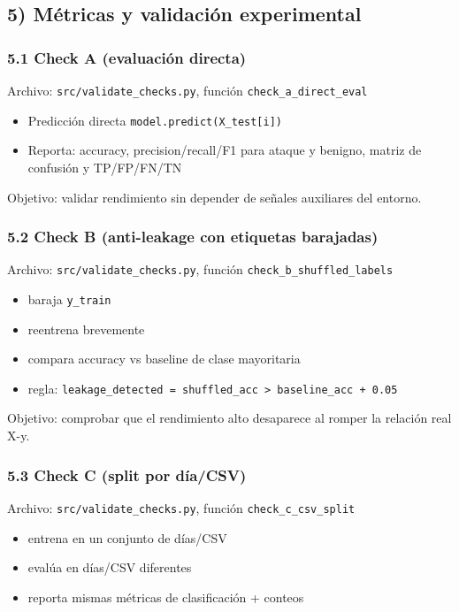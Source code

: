 ﻿\documentclass[12pt,a4paper]{article}
\begin{document}
\subsection{5) Métricas y validación experimental}

\subsubsection{5.1 Check A (evaluación directa)}

Archivo: \verb|src/validate_checks.py|, función \verb|check_a_direct_eval|

\begin{itemize}
  \item Predicción directa \verb|model.predict(X_test[i])|
  \item Reporta: accuracy, precision/recall/F1 para ataque y benigno, matriz de confusión y
        TP/FP/FN/TN
\end{itemize}

Objetivo: validar rendimiento sin depender de señales auxiliares del entorno.

\subsubsection{5.2 Check B (anti-leakage con etiquetas barajadas)}

Archivo: \verb|src/validate_checks.py|, función \verb|check_b_shuffled_labels|

\begin{itemize}
  \item baraja \texttt{y\_train}
  \item reentrena brevemente
  \item compara accuracy vs baseline de clase mayoritaria
  \item regla: \texttt{leakage\_detected = shuffled\_acc > baseline\_acc + 0.05}
\end{itemize}

Objetivo: comprobar que el rendimiento alto desaparece al romper la relación real X-y.

\subsubsection{5.3 Check C (split por día/CSV)}

Archivo: \verb|src/validate_checks.py|, función \verb|check_c_csv_split|

\begin{itemize}
  \item entrena en un conjunto de días/CSV
  \item evalúa en días/CSV diferentes
  \item reporta mismas métricas de clasificación + conteos
\end{itemize}
\end{document}

